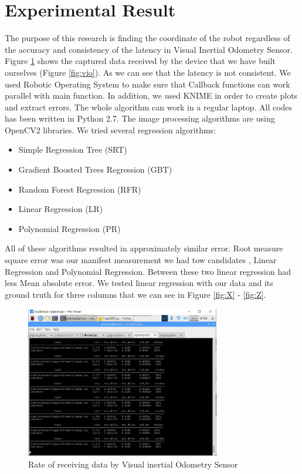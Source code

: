 \documentclass[a4paper,twoside]{article}
\begin{document}
\section{Experimental Result}
The purpose of this research is  finding the coordinate of the robot regardless of the accuracy and consistency of the latency in Visual Inertial Odometry Sensor.
Figure \ref{fig:rasp} shows the captured data received by the device that we have built ourselves (Figure \ref{fig:vio}). As we can see that the latency is not consistent.
We used Robotic Operating System to make sure that Callback functions can work parallel with main function. In addition, we used KNIME in order to create plots and extract errors. The whole algorithm can work in a regular laptop. All codes has been written in Python 2.7. The image processing algorithms are using OpenCV2 libraries. 
 We tried several regression algorithms:
\begin{itemize}
\item Simple Regression Tree (SRT)
\item Gradient Boosted Trees Regression (GBT)
\item Random Forest Regression (RFR)
\item Linear Regression (LR)
\item Polynomial Regression (PR)

\end{itemize}

All of these algorithms resulted in approximately similar error. Root measure square error was our manifest measurement we had tow candidates , Linear Regression and Polynomial Regression. Between these two linear regression had less Mean absolute error.
We tested linear regression with our data and its ground truth for three columns that we can see in Figure \ref{fig:X} - \ref{fig:Z}.
 
\begin{figure}

  \includegraphics[width=85mm]{Rasp.JPG}
  \caption{Rate of receiving data by Visual inertial Odometry Sensor  }
  \label{fig:rasp}
\end{figure} 
\end{document}
